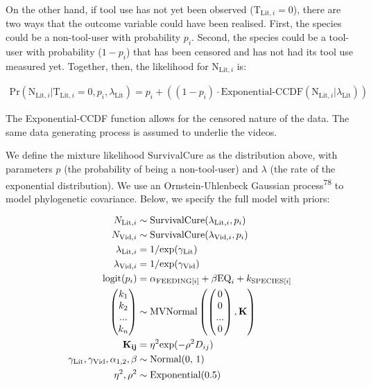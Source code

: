 \documentclass[
  man, donotrepeattitle,floatsintext]{apa6}
\begin{document}
On the other hand, if tool use has not yet been observed
(\(\text{T}_{\text{Lit},i} = 0\)), there are two ways that the outcome variable
could have been realised. First, the species could be a non-tool-user with
probability \(p_i\). Second, the species could be a tool-user with probability
(\(1 - p_i\)) that has been censored and has not had its tool use measured yet.
Together, then, the likelihood for \(\text{N}_{\text{Lit},i}\) is:

\begin{align}
\text{Pr}(\text{N}_{\text{Lit},i}|\text{T}_{\text{Lit},i} = 0,p_i,\lambda_\text{Lit}) = p_i + ((1-p_i)\cdot\text{Exponential-CCDF}(\text{N}_{\text{Lit},i}|\lambda_\text{Lit}))
\end{align}

The Exponential-CCDF function allows for the censored nature of the data. The
same data generating process is assumed to underlie the videos.

We define the mixture likelihood \(\text{SurvivalCure}\) as the distribution
above, with parameters \(p\) (the probability of being a non-tool-user)
and \(\lambda\) (the rate of the exponential distribution). We use an
Ornstein-Uhlenbeck Gaussian process\textsuperscript{78} to model phylogenetic
covariance. Below, we specify the full model with priors:

\begin{align}
N_{\text{Lit},i} &\sim \text{SurvivalCure}(\lambda_{\text{Lit},i}, p_{i}) \\
N_{\text{Vid},i} &\sim \text{SurvivalCure}(\lambda_{\text{Vid},i}, p_{i}) \nonumber \\
\lambda_{\text{Lit},i} &= 1 / \text{exp}(\gamma_\text{Lit}) \nonumber \\
\lambda_{\text{Vid},i} &= 1 / \text{exp}(\gamma_\text{Vid}) \nonumber \\
\text{logit}(p_{i}) &= \alpha_{\text{FEEDING}[i]} + \beta\text{EQ}_{i} +  k_{\text{SPECIES}[i]} \nonumber \\
\begin{pmatrix}k_{1}\\k_{2}\\...\\k_{n}\\\end{pmatrix}
&\sim \text{MVNormal}
\begin{pmatrix}\begin{pmatrix}0\\0\\...\\0\\\end{pmatrix},\bf{K}\end{pmatrix} \nonumber \\
\bf{K}_{ij} &= \eta^2\text{exp}(-\rho^2D_{ij}) \nonumber \\
\gamma_\text{Lit}, \gamma_\text{Vid}, \alpha_{1,2}, \beta &\sim \text{Normal(0, 1)} \nonumber \\
\eta^2, \rho^2 &\sim \text{Exponential(0.5)} \nonumber
\end{align}
\end{document}
